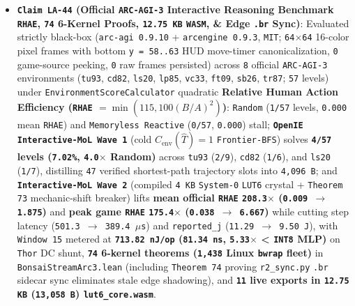 \documentclass[10pt]{article}
\begin{document}
\begin{itemize}
  \item \textbf{\texttt{Claim LA-44} (Official \texttt{ARC-AGI-3} Interactive Reasoning Benchmark \texttt{RHAE}, \texttt{74} 6-Kernel Proofs, \texttt{12.75 KB} \texttt{WASM}, \& Edge \texttt{.br} Sync)}: Evaluated strictly black-box (\texttt{arc-agi 0.9.10} + \texttt{arcengine 0.9.3}, \texttt{MIT}; \texttt{64$\times$64} 16-color pixel frames with bottom \texttt{y = 58..63} HUD move-timer canonicalization, \texttt{0} game-source peeking, \texttt{0} raw frames persisted) across \texttt{8} official \texttt{ARC-AGI-3} environments (\texttt{tu93}, \texttt{cd82}, \texttt{ls20}, \texttt{lp85}, \texttt{vc33}, \texttt{ft09}, \texttt{sb26}, \texttt{tr87}; \texttt{57} levels) under \texttt{EnvironmentScoreCalculator} quadratic \textbf{Relative Human Action Efficiency (\texttt{RHAE} $= \min(115, 100 (B/A)^2)$)}: \texttt{Random} (\texttt{1/57} levels, \texttt{0.000} mean \texttt{RHAE}) and \texttt{Memoryless Reactive} (\texttt{0/57}, \texttt{0.000}) stall; \textbf{\texttt{OpenIE Interactive-MoL Wave 1}} (cold $C_{\text{env}}(\hat{T})=1$ \texttt{Frontier-BFS}) solves \textbf{\texttt{4/57} levels (\texttt{7.02\%}, \texttt{4.0$\times$} Random)} across \texttt{tu93} (\texttt{2/9}), \texttt{cd82} (\texttt{1/6}), and \texttt{ls20} (\texttt{1/7}), distilling \texttt{47} verified shortest-path trajectory slots into \texttt{4,096 B}; and \textbf{\texttt{Interactive-MoL Wave 2}} (compiled \texttt{4 KB} \texttt{System-0} \texttt{LUT6} crystal + \texttt{Theorem 73} mechanic-shift breaker) lifts \textbf{mean official \texttt{RHAE} \texttt{208.3$\times$} (\texttt{0.009 $\to$ 1.875})} and \textbf{peak game \texttt{RHAE} \texttt{175.4$\times$} (\texttt{0.038 $\to$ 6.667})} while cutting step latency (\texttt{501.3 $\to$ 389.4 $\mu$s}) and \texttt{reported\_j} (\texttt{11.29 $\to$ 9.50 J}), with \texttt{Window 15} metered at \textbf{\texttt{713.82 nJ/op} (\texttt{81.34 ns}, \texttt{5.33$\times$} < \texttt{INT8} MLP)} on \texttt{Thor} DC shunt, \textbf{\texttt{74} 6-kernel theorems (\texttt{1,438} Linux \texttt{bwrap} fleet)} in \texttt{BonsaiStreamArc3.lean} (including \texttt{Theorem 74} proving \texttt{r2\_sync.py} \texttt{.br} sidecar sync eliminates stale edge shadowing), and \textbf{\texttt{11} live exports in \texttt{12.75 KB} (\texttt{13,058 B}) \texttt{lut6\_core.wasm}}.
\end{itemize}
\end{document}
